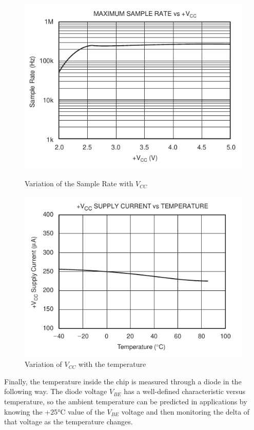 \documentclass[11pt,a4paper,titlepage]{article}
\begin{document}
			\begin{figure}[htbp]
				\begin{minipage}{.5\textwidth}
					\centering
					\includegraphics[width=\textwidth]{samplerate_vcc.png}
					\caption{Variation of the Sample Rate with $V_{CC}$}
					\label{fig:sample_vcc}
				\end{minipage}
				\begin{minipage}{.5\textwidth}
					\centering
					\includegraphics[width=\textwidth]{VCC_temp.png}
					\caption{Variation of $V_{CC}$ with the temperature}
					\label{fig:vcc_temp}
				\end{minipage}
			\end{figure}

			Finally, the temperature inside the chip is measured through a diode in the following way.
			The diode voltage $V_{BE}$ has a well-defined characteristic versus temperature, so the ambient temperature can be predicted in applications by knowing the +25°C value of the $V_{BE}$ voltage and then monitoring the delta of that voltage as the temperature changes.


\end{document}
